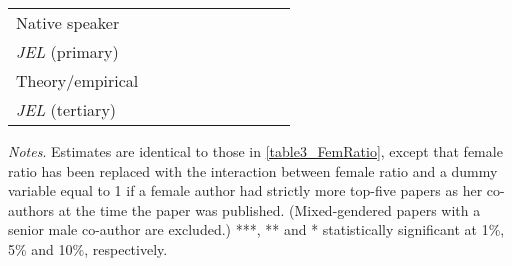 \begin{table}[H]
\begin{threeparttable}
\begin{tabular}{p{2cm}S@{}S@{}S@{}S@{}S@{}S@{}S@{}S@{}S@{}}
            Native speaker                &               &               &               &               &           {}   &           {}   &           {}   &           {}   &           {}   \\
            \textit{JEL} (primary)        &               &               &               &               &               &               &           {}   &               &               \\
            Theory/empirical              &               &               &               &               &               &               &               &           {}   &               \\
            \textit{JEL} (tertiary)       &               &               &               &               &               &               &               &               &           {}   \\
            \bottomrule
        \end{tabular}
        \begin{tablenotes}
            \tiny
            \item \textit{Notes}. Estimates are identical to those in \autoref{table3_FemRatio}, except that female ratio has been replaced with the interaction between female ratio and a dummy variable equal to 1 if a female author had strictly more top-five papers as her co-authors at the time the paper was published. (Mixed-gendered papers with a senior male co-author are excluded.) ***, ** and * statistically significant at 1\%, 5\% and 10\%, respectively.
        \end{tablenotes}
    \end{threeparttable}
\end{table}